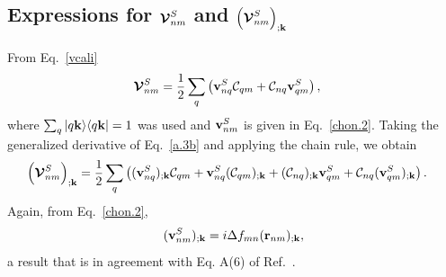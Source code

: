 \documentclass[floatfix,prb,aps,superscriptaddress,showpacs,11pt,preprint,letterpaper]{revtex4}
\begin{document}
\subsection{Expressions for  \texorpdfstring{$\boldsymbol{\mathcal{\cal V}}^{S}_{nm}$}{Vnm}
and
\texorpdfstring{$\Big({\boldsymbol{\mathcal{\cal V}}}^{S}_{nm}\Big)_{;\mathbf{k}}$}{(Vnm);kb}
}\label{calvs} 

From Eq.~\eqref{vcali}
\begin{align}\label{a.3b}
\boldsymbol{\mathcal{\cal V}}^{S}_{nm}
&=
\frac{1}{2}\sum_q\left(   
\mathbf{v}^S_{nq}{\mathbf{\cal C}}_{qm}+{\mathbf{\cal C}}_{nq}\mathbf{v}^S_{qm}
\right)  
,
\end{align}    
where $\sum_q| q\mathbf{k} \rangle\langle q\mathbf{k} |=1$ was used
and $\mathbf{v}^S_{nm}$ is given in Eq.~\eqref{chon.2}.
Taking the generalized derivative of Eq.~\eqref{a.3b}
and applying
the chain rule, we obtain
\begin{align}\label{a.3bn}
\left(\boldsymbol{\mathcal{\cal V}}^{S}_{nm}\right)_{;\mathbf{k}}
&=
\frac{1}{2}\sum_q\left(
(\mathbf{v}^S_{nq})_{;\mathbf{k}}{\mathbf{\cal C}}_{qm}
+    
\mathbf{v}^S_{nq}({\mathbf{\cal C}}_{qm})_{;\mathbf{k}}
+
({\mathbf{\cal C}}_{nq})_{;\mathbf{k}} \mathbf{v}^S_{qm}
+
{\mathbf{\cal C}}_{nq} (\mathbf{v}^S_{qm})_{;\mathbf{k}}
\right)  
.
\end{align}    
Again, from
Eq.~\eqref{chon.2}, 
\begin{align}\label{choni.1}
(\mathbf{v}^S_{nm})_{;\mathbf{k}}=i\Delta f_{mn}
(\mathbf{r}_{nm})_{;\mathbf{k}}
,
\end{align}
a result that is in agreement with Eq. A(6) of Ref.~.

\newpage

\end{document}
